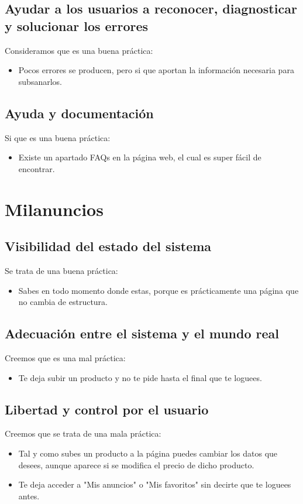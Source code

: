 \documentclass[openany,overnay,a4paper, twoside, 14pt]{book}
\begin{document}
\section*{Ayudar a los usuarios a reconocer, diagnosticar y solucionar los errores}
Consideramos que es una buena práctica:
\begin{itemize}
\item Pocos errores se producen, pero si que aportan la información necesaria para subsanarlos.
\end{itemize}
\section*{Ayuda y documentación}
Si que es una buena práctica:
\begin{itemize}
\item Existe un apartado FAQs en la página web, el cual es super fácil de encontrar.
\end{itemize}
\setcounter{chapter}{5}
\chapter*{Milanuncios}
\setcounter{section}{0}
\section*{Visibilidad del estado del sistema}
Se trata de una buena práctica:
\begin{itemize}
\item Sabes en todo momento donde estas, porque es prácticamente una página que no cambia de estructura.
\end{itemize}
\section*{Adecuación entre el sistema y el mundo real}
Creemos que es una mal práctica:
\begin{itemize}
\item Te deja subir un producto y no te pide hasta el final que te loguees.
\end{itemize}
\section*{Libertad y control por el usuario}
Creemos que se trata de una mala práctica:
\begin{itemize}
\item Tal y como subes un producto a la página puedes cambiar los datos que desees, aunque aparece si se modifica el precio de dicho producto.
\item Te deja acceder a "Mis anuncios" o "Mis favoritos" sin decirte que te loguees antes.
\end{itemize}
\end{document}
